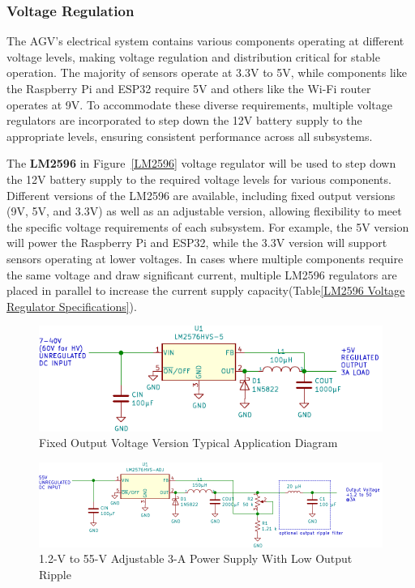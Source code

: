 \documentclass[../../main]{subfiles}
\begin{document}
\subsubsection{Voltage Regulation}

The AGV's electrical system contains various components operating 
at different voltage levels, making voltage regulation and 
distribution critical for stable operation. The majority of 
sensors operate at 3.3V to 5V, while components like the Raspberry Pi 
and ESP32 require 5V and others like the Wi-Fi router operates at 9V. 
To accommodate these diverse requirements, multiple voltage regulators 
are incorporated to step down the 12V battery supply to the appropriate 
levels, ensuring consistent performance across all subsystems. 


The \textbf{LM2596} in Figure~\ref{LM2596} voltage regulator will be used to step down the 12V battery 
supply to the required voltage levels for various components. Different 
versions of the LM2596 are available, including fixed output versions 
(9V, 5V, and 3.3V) as well as an adjustable version, allowing flexibility 
to meet the specific voltage requirements of each subsystem. For example, 
the 5V version will power the Raspberry Pi and ESP32, while the 3.3V version 
will support sensors operating at lower voltages. In cases where multiple 
components require the same voltage and draw significant current, multiple 
LM2596 regulators are placed in parallel to increase the current supply 
capacity(Table\ref{LM2596 Voltage Regulator Specifications}).

\begin{figure}[p] %
    \centering
    \includegraphics[width=\textwidth]{fig/lm2576.pdf}
    \caption{Fixed Output Voltage Version Typical Application Diagram}
    \label{fig:LM2596_Fixed_Output_Voltage} 
\end{figure}

\begin{figure}[p]
    \centering
    \includegraphics[width=\textwidth]{fig/lm2576_module_adj.pdf}
    \caption{1.2-V to 55-V Adjustable 3-A Power Supply With Low Output Ripple}
    \label{fig:LM2596_Adjustable_Output_Voltage} 
\end{figure}
\end{document}
